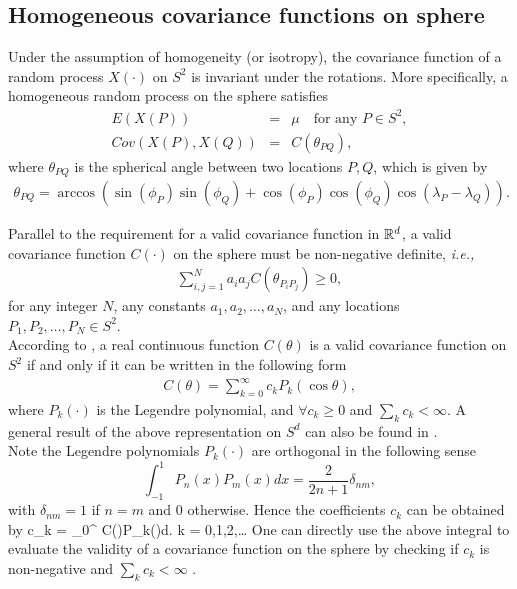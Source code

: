 	\subsection{\bf Homogeneous covariance functions on sphere}
	
Under the assumption of homogeneity (or isotropy), the covariance function of a random process $X(\cdot)$ on $S^2$ is invariant under the rotations. More specifically, a homogeneous random process on the sphere satisfies
	\begin{eqnarray*}
	E(X(P)) &=& \mu \quad \mbox{for any } P \in S^2, \\
		Cov(X(P),X(Q)) &=& C(\theta_{PQ}),
	\end{eqnarray*}
where $\theta_{PQ}$ is the spherical angle between two locations $P, Q$, which is given by 
	\begin{eqnarray*}
		\theta_{PQ}  = \arccos\left(\sin(\phi_P)\sin(\phi_Q) + \cos(\phi_P)\cos(\phi_Q)\cos(\lambda_P-\lambda_Q)\right).
	\end{eqnarray*}
	
Parallel to the requirement for a valid covariance function in $\mathbb{R}^d$, a valid covariance function $C(\cdot)$ on the sphere must be non-negative definite, {\em i.e.,}
	\begin{eqnarray*}
	\sum_{i,j=1}^{N} a_i a_j C(\theta_{P_iP_j}) \ge 0,
    \end{eqnarray*}
for any integer $N$, any constants $a_1, a_2, \ldots, a_N$, and any locations $P_1, P_2, \ldots, P_N \in S^2$. \\

According to \cite{schoenberg1942}, a real continuous function $C(\theta)$ is a valid covariance function on $S^2$ if and only if it can be written in the following form
	\begin{eqnarray*}
	C(\theta) = \sum_{k = 0}^\infty c_k P_k(\cos\theta), 
	\end{eqnarray*}
where $P_k(\cdot)$ is the Legendre polynomial, and $\forall c_k\ge 0$ and $\sum_k c_k < \infty$. A general result of the above representation on $S^d$ can also be found in \cite{schoenberg1942}. \\
	
Note the Legendre polynomials $P_k(\cdot)$ are orthogonal in the following sense
	\[
		\int_{-1}^{1} P_{n}(x)P_{m}(x)dx = \frac{2}{2n+1}\delta_{nm},
	\]
with $\delta_{nm} = 1$ if $n=m$ and 0 otherwise. Hence the coefficients $c_k$ can be obtained by
	\beq \label{covs2_coef}
	c_{k} = \int_0^{\pi} C(\theta)P_{k}(\cos\theta)d\theta. \quad k = 0,1,2,\ldots
	\eeq
One can directly use the above integral to evaluate the validity of a covariance function on the sphere by checking if $c_k$ is non-negative and $\sum_k c_k < \infty$ . \\
	
